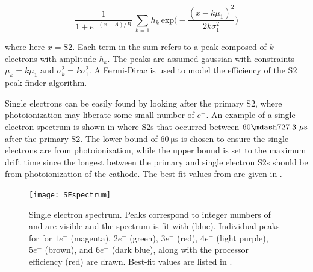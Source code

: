 \begin{equation}
\frac{1}{1 + e^{-(x - A) / B}}\ \sum_{k = 1} h_k\ \mathrm{exp} \bigg( -\frac{(x - k \mu_1)^2}{2 k \sigma_1^2} \bigg)
\label{eq:det_char_single_electron_gain_model}
\end{equation}

\noindent where here $x = \mathrm{S2}$.  Each term in the sum refers to a peak composed of $k$ electrons with amplitude $h_k$.  The
peaks are assumed gaussian with constraints $\mu_k = k \mu_1$ and $\sigma_k^2 = k \sigma_1^2$.  A Fermi-Dirac is used to model the
efficiency of the S2 peak finder algorithm.

Single electrons can be easily found by looking after the primary S2, where photoionization may liberate some small number of $e^-$.  An
example of a single electron spectrum is shown in  where S2s that occurred
between $60 \mdash 727.3\ \mathrm{\mu s}$ after the primary S2.  The lower bound of $60\ \mathrm{\mu s}$ is chosen to
ensure the single electrons are from photoionization, while the upper bound is set to the maximum drift time since the longest
between the primary and single electron S2s should be from photoionization of the cathode.  The best-fit values from
 are given in .

\begin{figure}
\centering
\texttt{[image: SEspectrum]}
\caption{Single electron spectrum.  Peaks correspond to integer numbers of \electron and are visible and the spectrum is fit
with  (blue).  Individual peaks for for $1 e^-$ (magenta), $2 e^-$ (green), $3 e^-$ (red),
$4 e^-$ (light purple), $5 e^-$ (brown), and $6 e^-$ (dark blue), along with the processor efficiency (red) are drawn.  Best-fit values
are listed in .}
\label{fig:calibrations_single_electron_gain_num_photons}
\end{figure}

